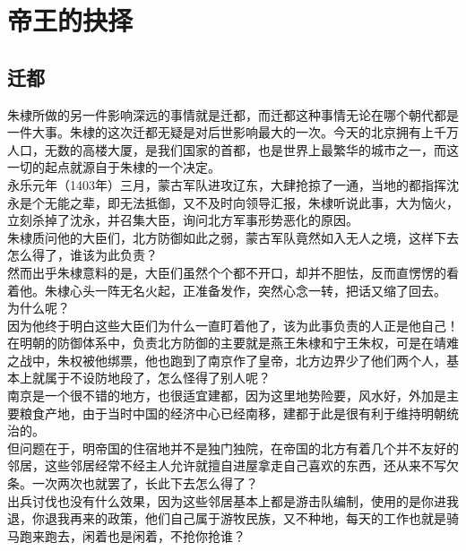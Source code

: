 \section{帝王的抉择}
\ifnum{}
	\begin{multicols}{\theparacolNo}
\fi
\subsection{迁都}
朱棣所做的另一件影响深远的事情就是迁都，而迁都这种事情无论在哪个朝代都是一件大事。朱棣的这次迁都无疑是对后世影响最大的一次。今天的北京拥有上千万人口，无数的高楼大厦，是我们国家的首都，也是世界上最繁华的城市之一，而这一切的起点就源自于朱棣的一个决定。\\

永乐元年（1403年）三月，蒙古军队进攻辽东，大肆抢掠了一通，当地的都指挥沈永是个无能之辈，即无法抵御，又不及时向领导汇报，朱棣听说此事，大为恼火，立刻杀掉了沈永，并召集大臣，询问北方军事形势恶化的原因。\\

朱棣质问他的大臣们，北方防御如此之弱，蒙古军队竟然如入无人之境，这样下去怎么得了，谁该为此负责？\\

然而出乎朱棣意料的是，大臣们虽然个个都不开口，却并不胆怯，反而直愣愣的看着他。朱棣心头一阵无名火起，正准备发作，突然心念一转，把话又缩了回去。\\

为什么呢？\\

因为他终于明白这些大臣们为什么一直盯着他了，该为此事负责的人正是他自己！\\

在明朝的防御体系中，负责北方防御的主要就是燕王朱棣和宁王朱权，可是在靖难之战中，朱权被他绑票，他也跑到了南京作了皇帝，北方边界少了他们两个人，基本上就属于不设防地段了，怎么怪得了别人呢？\\

南京是一个很不错的地方，也很适宜建都，因为这里地势险要，风水好，外加是主要粮食产地，由于当时中国的经济中心已经南移，建都于此是很有利于维持明朝统治的。\\

但问题在于，明帝国的住宿地并不是独门独院，在帝国的北方有着几个并不友好的邻居，这些邻居经常不经主人允许就擅自进屋拿走自己喜欢的东西，还从来不写欠条。一次两次也就罢了，长此下去怎么得了？\\

出兵讨伐也没有什么效果，因为这些邻居基本上都是游击队编制，使用的是你进我退，你退我再来的政策，他们自己属于游牧民族，又不种地，每天的工作也就是骑马跑来跑去，闲着也是闲着，不抢你抢谁？\\


\end{multicols}
